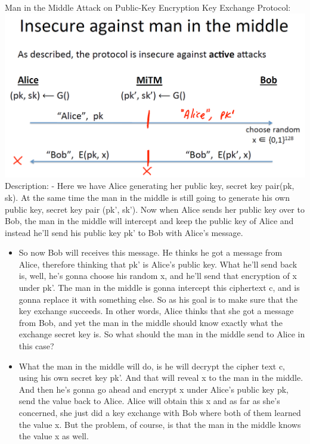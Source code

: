 \documentclass[11pt]{article}
\makeatletter
\def\maxwidth{\ifdim\Gin@nat@width>\linewidth\linewidth
    \else\Gin@nat@width\fi}
\let\Oldincludegraphics\includegraphics
\renewcommand{\includegraphics}[1]{\Oldincludegraphics[width=.8\maxwidth]{#1}}
\makeatother
\begin{document}
Man in the Middle Attack on Public-Key Encryption Key Exchange Protocol:
\includegraphics{./Images/PKE-MiTM.png} Description: - Here we have
Alice generating her public key, secret key pair(pk, sk). At the same
time the man in the middle is still going to generate his own public
key, secret key pair (pk', sk'). Now when Alice sends her public key
over to Bob, the man in the middle will intercept and keep the public
key of Alice and instead he'll send his public key pk' to Bob with
Alice's message.

\begin{itemize}
\item
  So now Bob will receives this message. He thinks he got a message from
  Alice, therefore thinking that pk' is Alice's public key. What he'll
  send back is, well, he's gonna choose his random x, and he'll send
  that encryption of x under pk'. The man in the middle is gonna
  intercept this ciphertext c, and is gonna replace it with something
  else. So as his goal is to make sure that the key exchange succeeds.
  In other words, Alice thinks that she got a message from Bob, and yet
  the man in the middle should know exactly what the exchange secret key
  is. So what should the man in the middle send to Alice in this case? 
\item
  What the man in the middle will do, is he will decrypt the cipher text
  c, using his own secret key pk'. And that will reveal x to the man in
  the middle. And then he's gonna go ahead and encrypt x under Alice's
  public key pk, send the value back to Alice. Alice will obtain this x
  and as far as she's concerned, she just did a key exchange with Bob
  where both of them learned the value x. But the problem, of course, is
  that the man in the middle knows the value x as well.
\end{itemize}
\end{document}
